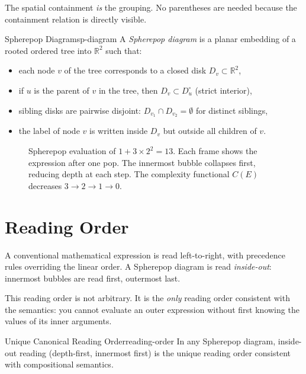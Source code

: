 The spatial containment \emph{is} the grouping. No parentheses are needed
because the containment relation is directly visible.

\begin{definition}{Spherepop Diagram}{sp-diagram}
  A \emph{Spherepop diagram} is a planar embedding of a rooted ordered
  tree into $\mathbb{R}^2$ such that:
  \begin{itemize}
    \item each node $v$ of the tree corresponds to a closed disk
          $D_v \subset \mathbb{R}^2$,
    \item if $u$ is the parent of $v$ in the tree, then $D_v \subset
          D_u^\circ$ (strict interior),
    \item sibling disks are pairwise disjoint:
          $D_{v_1} \cap D_{v_2} = \emptyset$ for distinct siblings,
    \item the label of node $v$ is written inside $D_v$ but outside
          all children of $v$.
  \end{itemize}
\end{definition}

\begin{figure}[h]
  \centering
  \begin{tikzpicture}[scale=0.72]
    
  \end{tikzpicture}
  \caption{Spherepop evaluation of $1 + 3 \times 2^2 = 13$.
    Each frame shows the expression after one pop. The innermost
    bubble collapses first, reducing depth at each step. The
    complexity functional $C(E)$ decreases $3 \to 2 \to 1 \to 0$.}
  \label{fig:sp-eval-ch3}
\end{figure}

\section{Reading Order}

A conventional mathematical expression is read left-to-right, with
precedence rules overriding the linear order. A Spherepop diagram is
read \emph{inside-out}: innermost bubbles are read first, outermost last.

This reading order is not arbitrary. It is the \emph{only} reading order
consistent with the semantics: you cannot evaluate an outer expression
without first knowing the values of its inner arguments.

\begin{proposition}{Unique Canonical Reading Order}{reading-order}
  In any Spherepop diagram, inside-out reading (depth-first, innermost
  first) is the unique reading order consistent with compositional
  semantics.
\end{proposition}

